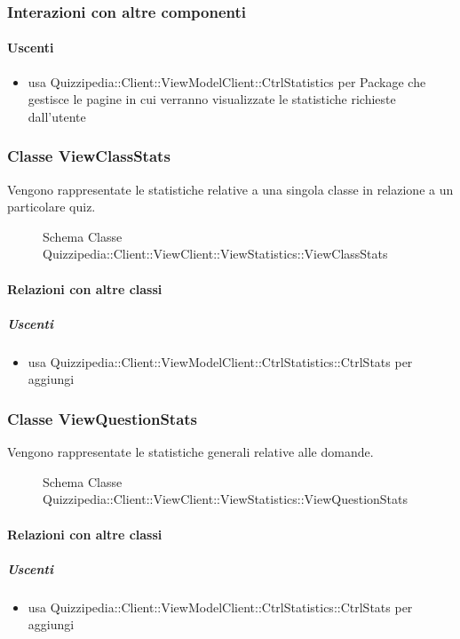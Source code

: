 \subsubsection{Interazioni con altre componenti}
\paragraph{Uscenti}
\begin{itemize}
\item usa Quizzipedia::Client::ViewModelClient::CtrlStatistics per Package che gestisce le pagine in cui verranno visualizzate le statistiche richieste dall'utente
\end{itemize}
\subsubsection{Classe ViewClassStats}
Vengono rappresentate le statistiche relative a una singola classe in relazione a un particolare quiz.
\begin{figure}[H]
\centering
\noindent{}
\caption[Schema Classe ViewClassStats]{Schema Classe Quizzipedia::Client::ViewClient::ViewStatistics::ViewClassStats}
\end{figure}
\paragraph{Relazioni con altre classi}
\subparagraph{Uscenti}
\begin{itemize}
\item usa Quizzipedia::Client::ViewModelClient::CtrlStatistics::CtrlStats per aggiungi
\end{itemize}
\subsubsection{Classe ViewQuestionStats}
Vengono rappresentate le statistiche generali relative alle domande.
\begin{figure}[H]
\centering
\noindent{}
\caption[Schema Classe ViewQuestionStats]{Schema Classe Quizzipedia::Client::ViewClient::ViewStatistics::ViewQuestionStats}
\end{figure}
\paragraph{Relazioni con altre classi}
\subparagraph{Uscenti}
\begin{itemize}
\item usa Quizzipedia::Client::ViewModelClient::CtrlStatistics::CtrlStats per aggiungi
\end{itemize}
